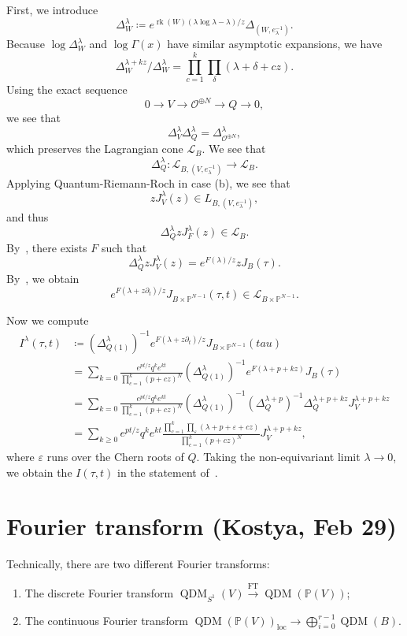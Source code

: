 \documentclass[leqno, openany]{memoir}
\theoremstyle{definition}
\theoremstyle{remark}
\theoremstyle{plain}
\theoremstyle{definition}
\theoremstyle{remark}
\renewcommand{\P}{\mathbb{P}}
\newcommand{\ep}{\varepsilon}
\newcommand{\mc}[1]{\mathcal{#1}}
\newcommand{\mr}[1]{\mathrm{#1}}
\newcommand{\on}[1]{\operatorname{#1}}
\DeclareMathOperator{\QDM}{QDM}
\begin{document}
First, we introduce
\[ \Delta_W^{\lambda} \coloneqq e^{\on{rk}(W) (\lambda \log \lambda - \lambda)/z} \Delta_{(W,e_{\lambda}^{-1})}. \]
Because $\log \Delta_W^{\lambda}$ and $\log \Gamma(x)$ have similar asymptotic expansions, we have
\[ \Delta_W^{\lambda + kz} / \Delta_W^{\lambda} = \prod_{c=1}^k \prod_{\delta} (\lambda + \delta + cz). \]
Using the exact sequence
\[ 0 \to V \to \mc{O}^{\oplus N} \to Q \to 0, \]
we see that
\[ \Delta_V^{\lambda} \Delta_Q^{\lambda} = \Delta_{\mc{O}^{\oplus N}}^{\lambda}, \]
which preserves the Lagrangian cone $\mc{L}_B$. We see that
\[ \Delta_Q^{\lambda} \colon \mc{L}_{B,(V, e_{\lambda}^{-1})} \to \mc{L}_B. \]
Applying Quantum-Riemann-Roch in case (b), we see that
\[ z J_V^{\lambda}(z) \in L_{B,(V, e_{\lambda}^{-1})}, \]
and thus
\[ \Delta_Q^{\lambda} z J_F^{\lambda}(z) \in \mc{L}_B. \]
By~, there exists $F$ such that
\[ \Delta_Q^{\lambda} z J_V^{\lambda}(z) = e^{F(\lambda)/z} z J_B(\tau). \]
By~, we obtain
\[ e^{F(\lambda + z \partial_t)/z} J_{B \times \P^{N-1}}(\tau, t) \in \mc{L}_{B \times \P^{N-1}}. \]

Now we compute
\begin{align*} 
    I^{\lambda}(\tau, t) &\coloneqq (\Delta_{Q(1)}^{\lambda})^{-1} e^{F(\lambda + z \partial_t)/z} J_{B \times \P^{N-1}}(tau) \\
    &= \sum_{k=0} \frac{e^{pt/z} q^k e^{kt}}{\prod_{c=1}^k (p+cz)^N} (\Delta_{Q(1)}^{\lambda})^{-1} e^{F(\lambda + p + kz)} J_B(\tau) \\
    &=\sum_{k=0} \frac{e^{pt/z} q^k e^{kt}}{\prod_{c=1}^k (p+cz)^N} (\Delta_{Q(1)}^{\lambda})^{-1} (\Delta_Q^{\lambda + p})^{-1} \Delta_Q^{\lambda+p+kz} J_V^{\lambda + p + kz} \\
    &= \sum_{k \geq 0}e^{pt/z}q^k e^{kt} \frac{\prod_{c=1}^k \prod_{\ep}(\lambda + p + \ep + cz)}{\prod_{c=1}^k (p+cz)^N} J_V^{\lambda + p + kz},
\end{align*}
where $\ep$ runs over the Chern roots of $Q$. Taking the non-equivariant limit $\lambda \to 0$, we obtain the $I(\tau, t)$ in the statement of~.

\section{Fourier transform (Kostya, Feb 29)}%
\label{sec:Fourier transform Kostya Feb 29}

Technically, there are two different Fourier transforms:
\begin{enumerate}
    \item The discrete Fourier transform $\on{QDM}_{S^1}(V) \xrightarrow{\mr{FT}} \on{QDM}(\P(V))$;
    \item The continuous Fourier transform $\QDM(\P(V))_{\mr{loc}} \to \bigoplus_{i=0}^{r-1} \QDM(B)$.
\end{enumerate}
\end{document}
